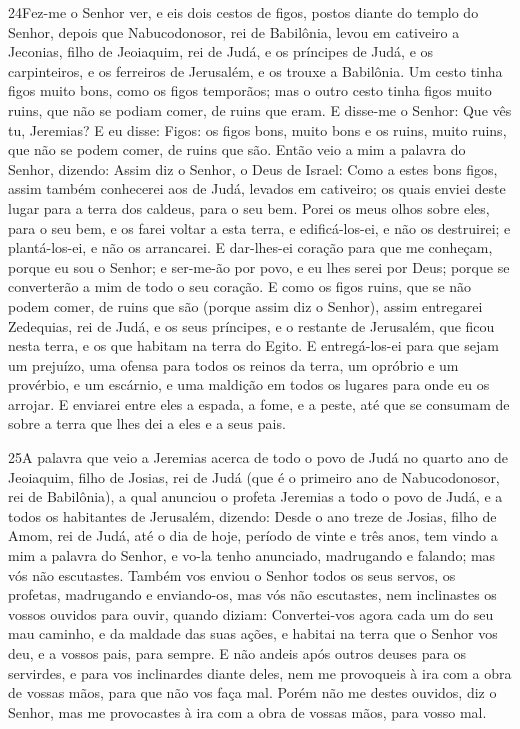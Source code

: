 \lettrine{24} Fez-me o Senhor ver, e eis dois cestos de figos,
postos diante do templo do Senhor, depois que Nabucodonosor, rei de
Babilônia, levou em cativeiro a Jeconias, filho de Jeoiaquim, rei de
Judá, e os príncipes de Judá, e os carpinteiros, e os ferreiros de
Jerusalém, e os trouxe a Babilônia. Um cesto tinha figos muito
bons, como os figos temporãos; mas o outro cesto tinha figos muito
ruins, que não se podiam comer, de ruins que eram. E disse-me o
Senhor: Que vês tu, Jeremias? E eu disse: Figos: os figos bons,
muito bons e os ruins, muito ruins, que não se podem comer, de ruins
que são. Então veio a mim a palavra do Senhor, dizendo:
Assim diz o Senhor, o Deus de Israel: Como a estes bons figos,
assim também conhecerei aos de Judá, levados em cativeiro; os quais
enviei deste lugar para a terra dos caldeus, para o seu bem.
Porei os meus olhos sobre eles, para o seu bem, e os farei
voltar a esta terra, e edificá-los-ei, e não os destruirei; e
plantá-los-ei, e não os arrancarei. E dar-lhes-ei coração para
que me conheçam, porque eu sou o Senhor; e ser-me-ão por povo, e eu
lhes serei por Deus; porque se converterão a mim de todo o seu
coração. E como os figos ruins, que se não podem comer, de ruins
que são (porque assim diz o Senhor), assim entregarei Zedequias, rei
de Judá, e os seus príncipes, e o restante de Jerusalém, que ficou
nesta terra, e os que habitam na terra do Egito. E
entregá-los-ei para que sejam um prejuízo, uma ofensa para todos os
reinos da terra, um opróbrio e um provérbio, e um escárnio, e uma
maldição em todos os lugares para onde eu os arrojar. E
enviarei entre eles a espada, a fome, e a peste, até que se consumam
de sobre a terra que lhes dei a eles e a seus pais.

\medskip

\lettrine{25} A palavra que veio a Jeremias acerca de todo o
povo de Judá no quarto ano de Jeoiaquim, filho de Josias, rei de
Judá (que é o primeiro ano de Nabucodonosor, rei de Babilônia),
a qual anunciou o profeta Jeremias a todo o povo de Judá, e a
todos os habitantes de Jerusalém, dizendo: Desde o ano treze de
Josias, filho de Amom, rei de Judá, até o dia de hoje, período de
vinte e três anos, tem vindo a mim a palavra do Senhor, e vo-la
tenho anunciado, madrugando e falando; mas vós não escutastes.
Também vos enviou o Senhor todos os seus servos, os profetas,
madrugando e enviando-os, mas vós não escutastes, nem inclinastes os
vossos ouvidos para ouvir, quando diziam: Convertei-vos agora
cada um do seu mau caminho, e da maldade das suas ações, e habitai
na terra que o Senhor vos deu, e a vossos pais, para sempre. E
não andeis após outros deuses para os servirdes, e para vos
inclinardes diante deles, nem me provoqueis à ira com a obra de
vossas mãos, para que não vos faça mal. Porém não me destes
ouvidos, diz o Senhor, mas me provocastes à ira com a obra de vossas
mãos, para vosso mal.

